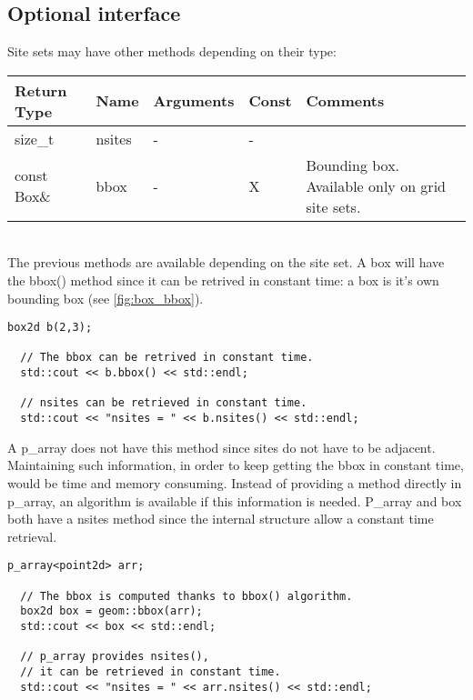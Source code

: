 \documentclass{report}
\begin{document}
\subsection{Optional interface}
Site sets may have other methods depending on their type: \\

\begin{tabular}{|l|l|l|l|p{4cm}|}
\hline
Return Type & Name & Arguments & Const & Comments \\ \hline

size\_t & nsites & - & - & \\ \hline
const Box\& & bbox & - & X &  Bounding box. Available only on grid site sets.
\\ \hline
\end{tabular} \\

The previous methods are available depending on the site set. A box
will have the bbox() method since it can be retrived in constant time: a box
is it's own bounding box (see \ref{fig:box_bbox}).

\begin{lstlisting}[frame=single]
  box2d b(2,3);

  // The bbox can be retrived in constant time.
  std::cout << b.bbox() << std::endl;

  // nsites can be retrieved in constant time.
  std::cout << "nsites = " << b.nsites() << std::endl;
\end{lstlisting}

A p\_array does not have this
method since sites do not have to be adjacent. Maintaining such information, in
order to keep getting the bbox in constant time, would be time and memory
consuming. Instead of providing a method directly in p\_array, an algorithm is
available if this information is needed.
P\_array and box both have a nsites method since the internal structure allow a
constant time retrieval.

\begin{lstlisting}[frame=single]
  p_array<point2d> arr;

  // The bbox is computed thanks to bbox() algorithm.
  box2d box = geom::bbox(arr);
  std::cout << box << std::endl;

  // p_array provides nsites(),
  // it can be retrieved in constant time.
  std::cout << "nsites = " << arr.nsites() << std::endl;
\end{lstlisting}
\end{document}
